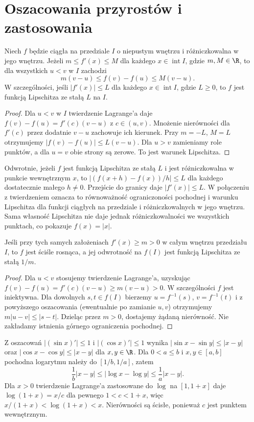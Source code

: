 \section{Oszacowania przyrostów i zastosowania}
\begin{twierdzenie}
\label{ma1:thm:mvt-increment-bounds}
Niech $f$ będzie ciągła na przedziale $I$ o niepustym wnętrzu i różniczkowalna w jego wnętrzu. Jeżeli $m\le f'(x)\le M$ dla każdego $x\in\operatorname{int}I$, gdzie $m,M\in\R$, to dla wszystkich $u<v$ w $I$ zachodzi
\[
 m(v-u)\le f(v)-f(u)\le M(v-u).
\]
W szczególności, jeśli $|f'(x)|\le L$ dla każdego $x\in\operatorname{int}I$, gdzie $L\ge0$, to $f$ jest funkcją Lipschitza ze stałą $L$ na $I$.
\end{twierdzenie}
\begin{proof}
Dla $u<v$ w $I$ twierdzenie Lagrange'a daje $f(v)-f(u)=f'(c)(v-u)$ z $c\in(u,v)$. Mnożenie nierówności dla $f'(c)$ przez dodatnie $v-u$ zachowuje ich kierunek. Przy $m=-L$, $M=L$ otrzymujemy $|f(v)-f(u)|\le L(v-u)$. Dla $u>v$ zamieniamy role punktów, a dla $u=v$ obie strony są zerowe. To jest warunek Lipschitza.
\end{proof}
Odwrotnie, jeżeli $f$ jest funkcją Lipschitza ze stałą $L$ i jest różniczkowalna w punkcie wewnętrznym $x$, to $|(f(x+h)-f(x))/h|\le L$ dla każdego dostatecznie małego $h\ne0$. Przejście do granicy daje $|f'(x)|\le L$. W połączeniu z twierdzeniem oznacza to równoważność ograniczoności pochodnej i warunku Lipschitza dla funkcji ciągłych na przedziale i różniczkowalnych w jego wnętrzu. Sama własność Lipschitza nie daje jednak różniczkowalności we wszystkich punktach, co pokazuje $f(x)=|x|$.

\begin{wniosek}
\label{ma1:cor:inverse-lipschitz-mvt}
Jeśli przy tych samych założeniach $f'(x)\ge m>0$ w całym wnętrzu przedziału $I$, to $f$ jest ściśle rosnąca, a jej odwrotność na $f(I)$ jest funkcją Lipschitza ze stałą $1/m$.
\end{wniosek}
\begin{proof}
Dla $u<v$ stosujemy twierdzenie Lagrange'a, uzyskując $f(v)-f(u)=f'(c)(v-u)\ge m(v-u)>0$. W szczególności $f$ jest iniektywna. Dla dowolnych $s,t\in f(I)$ bierzemy $u=f^{-1}(s)$, $v=f^{-1}(t)$ i z powyższego oszacowania (ewentualnie po zamianie $u,v$) otrzymujemy $m|u-v|\le |s-t|$. Dzieląc przez $m>0$, dostajemy żądaną nierówność. Nie zakładamy istnienia górnego ograniczenia pochodnej.
\end{proof}
\begin{przyklad}
\label{ma1:ex:mvt-elementary-bounds}
Z oszacowań $|(\sin x)'|\le1$ i $|(\cos x)'|\le1$ wynika
$|\sin x-\sin y|\le|x-y|$ oraz $|\cos x-\cos y|\le|x-y|$ dla $x,y\in\R$.
Dla $0<a\le b$ i $x,y\in[a,b]$ pochodna logarytmu należy do $[1/b,1/a]$, zatem
\[
 \frac1b|x-y|\le|\log x-\log y|\le\frac1a|x-y|.
\]
Dla $x>0$ twierdzenie Lagrange'a zastosowane do $\log$ na $[1,1+x]$ daje $\log(1+x)=x/c$ dla pewnego $1<c<1+x$, więc $x/(1+x)<\log(1+x)<x$. Nierówności są ścisłe, ponieważ $c$ jest punktem wewnętrznym.
\end{przyklad}

